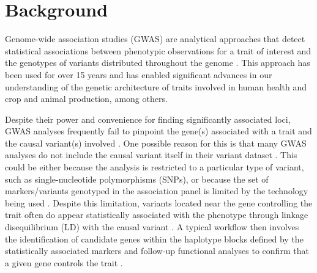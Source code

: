 \documentclass[doublespacing]{bmcart}
\begin{document}
\begin{frontmatter}
\begin{abstractbox}

\end{abstractbox}
%

\end{frontmatter}


\section*{Background}
Genome-wide association studies (GWAS) are analytical approaches that detect
statistical associations between phenotypic observations for a trait of
interest and the genotypes of variants distributed throughout the
genome \cite{tam2019}. This approach has been used for over 15 years
\cite{visscher2012} and has enabled significant advances in our understanding
of the genetic architecture of traits involved in human health
\cite[e.g.][]{wellcome2007gwas} and crop \cite{tibbs2021} and animal
\cite{ma2019} production, among others.

Despite their power and convenience for finding significantly associated loci,
GWAS analyses frequently fail to pinpoint the gene(s) associated with a trait and
the causal variant(s) involved \cite{tam2019}. One possible reason for this
is that many GWAS analyses do not include the causal variant itself in their variant dataset
\cite{tibbs2021}. This could be either because the analysis
is restricted to a particular type of variant, such as single-nucleotide
polymorphisms (SNPs), or because the set of markers/variants genotyped in the
association panel is limited by the technology being used
\cite[e.g.][]{bandillo2015, sonah2015}. Despite this limitation, variants
located near the gene controlling the trait often do appear statistically
associated with the phenotype through linkage disequilibrium (LD) with the
causal variant \cite{korte2013}.  A typical workflow then involves the
identification of candidate genes within the haplotype blocks defined by the
statistically associated markers and follow-up functional analyses to confirm
that a given gene controls the trait \cite[e.g.][]{wang2018, liu2020ps}.
\end{document}
